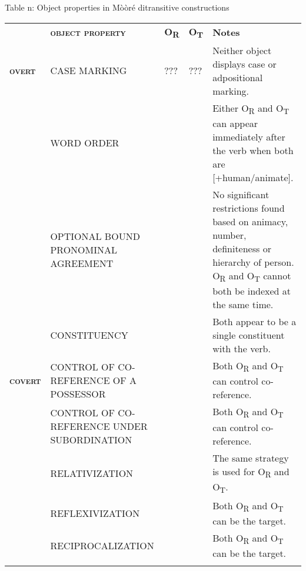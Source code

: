 \documentclass[output=paper]{langsci/langscibook}
\begin{document}
\begin{styleTabellenberschrift}
\label{bkm:Ref444780947}Table n: Object properties in Mòòré ditransitive constructions
\end{styleTabellenberschrift}

\begin{tabular}{lllll} & \textbf{\textsc{object property}} & \textbf{O}\textbf{\textsubscript{R}} & \textbf{O}\textbf{\textsubscript{T}} & \textbf{Notes}\\
\lsptoprule
{ \textbf{\textsc{overt}}} & CASE MARKING & ??? & ??? & Neither object displays case or adpositional marking.\\
& WORD ORDER & 

 & 

 & Either O\textsubscript{R} and O\textsubscript{T} can appear immediately after the verb when both are [+human/animate]. \\
\hhline{~----} & OPTIONAL BOUND PRONOMINAL AGREEMENT & 

 & 

 & No significant restrictions found based on animacy, number, definiteness or hierarchy of person. O\textsubscript{R} and O\textsubscript{T} cannot both be indexed at the same time.\\
\hhline{~----} & CONSTITUENCY & 

 & 

 & Both appear to be a single constituent with the verb.\\
{ \textbf{\textsc{covert}}} & CONTROL OF CO-REFERENCE OF A POSSESSOR & 

 & 

 & Both O\textsubscript{R }and O\textsubscript{T} can control co-reference.\\
& CONTROL OF CO-REFERENCE UNDER SUBORDINATION & 

 & 

 & Both O\textsubscript{R }and O\textsubscript{T} can control co-reference.\\
\hhline{~----} & RELATIVIZATION & 

 & 

 & The same strategy is used for O\textsubscript{R} and O\textsubscript{T}.\\
\hhline{~----} & REFLEXIVIZATION & 

 & 

 & Both O\textsubscript{R }and O\textsubscript{T }can be the target.\\
\hhline{~----} & RECIPROCALIZATION & 

 & 

 & Both O\textsubscript{R }and O\textsubscript{T }can be the target.\\
\hhline{~----}
\lspbottomrule
\end{tabular}
\end{document}
